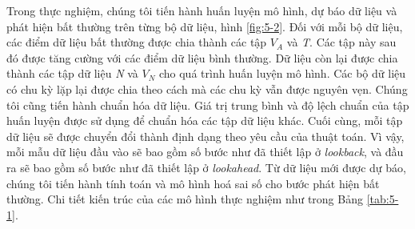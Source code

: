 Trong thực nghiệm, chúng tôi tiến hành huấn luyện mô hình, dự báo dữ liệu và phát hiện bất thường trên từng bộ dữ liệu, hình \ref{fig:5-2}. Đối với mỗi bộ dữ liệu, các điểm dữ liệu bất thường được chia thành các tập $V_{A}$ và \textit{T}. Các tập này sau đó được tăng cường với các điểm dữ liệu bình thường. Dữ liệu còn lại được chia thành các tập dữ liệu \textit{N} và $V_{N}$ cho quá trình huấn luyện mô hình. Các bộ dữ liệu có chu kỳ lặp lại được chia theo cách mà các chu kỳ vẫn được nguyên vẹn. Chúng tôi cũng tiến hành chuẩn hóa dữ liệu. Giá trị trung bình và độ lệch chuẩn của tập huấn luyện được sử dụng để chuẩn hóa các tập dữ liệu khác. Cuối cùng, mỗi tập dữ liệu sẽ được chuyển đổi thành định dạng theo yêu cầu của thuật toán. Vì vậy, mỗi mẫu dữ liệu đầu vào sẽ bao gồm số bước như đã thiết lập ở \textit{lookback}, và đầu ra sẽ bao gồm số bước như đã thiết lập ở \textit{lookahead}. Từ dữ liệu mới được dự báo, chúng tôi tiến hành tính toán và mô hình hoá sai số cho bước phát hiện bất thường. Chi tiết kiến trúc của các mô hình thực nghiệm như trong Bảng \ref{tab:5-1}.




